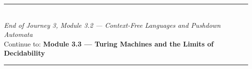 \documentclass[12pt, a4paper]{book}
\begin{document}
\vspace{1.4cm}
\begin{center}
{\color{JourneyColor}\rule{0.5\linewidth}{0.8pt}}\\[6pt]
{\small\color{JourneyColor}\textit{End of Journey 3, Module 3.2 --- Context-Free Languages and Pushdown Automata}}\\[4pt]
{\small\color{JourneyColor}Continue to: \textbf{Module 3.3 --- Turing Machines and the Limits of Decidability}}\\[6pt]
{\color{JourneyColor}\rule{0.5\linewidth}{0.8pt}}
\end{center}
\end{document}
